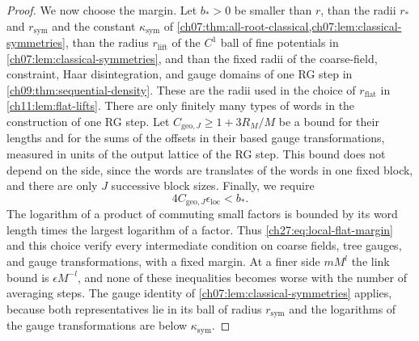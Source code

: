 \begin{proof}
We now choose the margin. Let $b_*>0$ be smaller than $r$, than the radii $r_*$ and $r_{\mathrm{sym}}$ and the constant $\kappa_{\mathrm{sym}}$ of \cref{ch07:thm:all-root-classical,ch07:lem:classical-symmetries}, than the radius $r_{\mathrm{lift}}$ of the $C^1$ ball of fine potentials in \cref{ch07:lem:classical-symmetries}, and than the fixed radii of the coarse-field, constraint, Haar disintegration, and gauge domains of one RG step in \cref{ch09:thm:sequential-density}. These are the radii used in the choice of $r_{\mathrm{flat}}$ in \cref{ch11:lem:flat-lifts}. There are only finitely many types of words in the construction of one RG step. Let $C_{\mathrm{geo},J}\ge1+3R_M/M$ be a bound for their lengths and for the sums of the offsets in their based gauge transformations, measured in units of the output lattice of the RG step. This bound does not depend on the side, since the words are translates of the words in one fixed block, and there are only $J$ successive block sizes. Finally, we require
\[
 4C_{\mathrm{geo},J}\epsilon_{\mathrm{loc}}<b_*.
\]
The logarithm of a product of commuting small factors is bounded by its word length times the largest logarithm of a factor. Thus \eqref{ch27:eq:local-flat-margin} and this choice verify every intermediate condition on coarse fields, tree gauges, and gauge transformations, with a fixed margin. At a finer side $mM^l$ the link bound is $\epsilon M^{-l}$, and none of these inequalities becomes worse with the number of averaging steps. The gauge identity of \cref{ch07:lem:classical-symmetries} applies, because both representatives lie in its ball of radius $r_{\mathrm{sym}}$ and the logarithms of the gauge transformations are below $\kappa_{\mathrm{sym}}$.


\end{proof}
